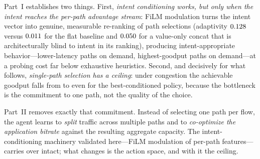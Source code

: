 Part~I establishes two things. First, \emph{intent conditioning works, but only
when the intent reaches the per-path advantage stream}: FiLM modulation turns the
intent vector into genuine, measurable re-ranking of path selections (adaptivity
$0.128$ versus $0.011$ for the flat baseline and
$0.050$ for a value-only concat that is architecturally blind to
intent in its ranking), producing intent-appropriate behavior---lower-latency
paths on demand, highest-goodput paths on demand---at a probing cost far below
exhaustive heuristics. Second, and decisively for what follows, \emph{single-path
selection has a ceiling}: under congestion the achievable goodput falls from
\filmGoodputHi{} to \filmGoodputLo{} even for the best-conditioned policy,
because the bottleneck is the commitment to one path, not the quality of the
choice.

Part~II removes exactly that commitment. Instead of selecting one path per flow,
the agent learns to \emph{split} traffic across multiple paths and to
\emph{co-optimize the application bitrate} against the resulting aggregate
capacity. The intent-conditioning machinery validated here---FiLM modulation of
per-path features---carries over intact; what changes is the action space, and
with it the ceiling.
